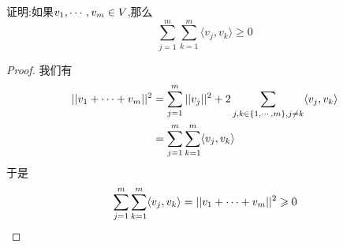 \documentclass{ctexart}
\begin{document}
\pagestyle{empty}
\begin{center}
    \large{}
\end{center}
\begin{problem}[1.]
    证明:如果${v}_1,\cdots,{v}_{m}\in V$,那么
    \[\sum_{j=1}^{m}\sum_{k=1}^{m}\langle v_j,v_k\rangle\geqslant 0\]
\end{problem}
\begin{proof}
    我们有
    \[\begin{aligned}
        ||{v}_1+\cdots+{v}_{m}||^2
        &= \sum_{j=1}^m||v_j||^2+2\sum_{j,k\in\{1,\cdots,m\},j\neq k}\langle v_j,v_k\rangle \\
        &= \sum_{j=1}^{m}\sum_{k=1}^{m}\langle v_j,v_k\rangle
    \end{aligned}\]
    于是
    \[\sum_{j=1}^{m}\sum_{k=1}^{m}\langle v_j,v_k\rangle=||{v}_1+\cdots+{v}_{m}||^2\geqslant0\]
\end{proof}
\end{document}
